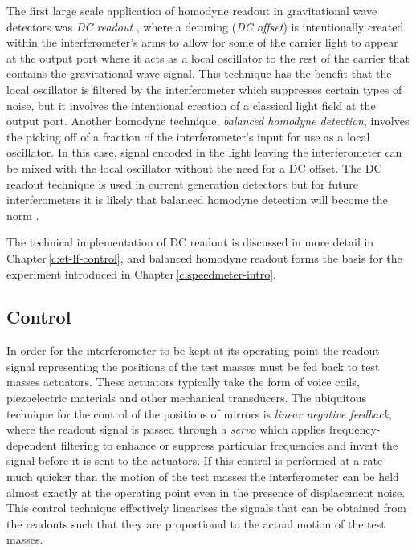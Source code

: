 The first large scale application of homodyne readout in gravitational wave detectors was \emph{\gls{DC} readout} \cite{Fricke2012}, where a detuning (\emph{\gls{DC} offset}) is intentionally created within the interferometer's arms to allow for some of the carrier light to appear at the output port where it acts as a local oscillator to the rest of the carrier that contains the gravitational wave signal. This technique has the benefit that the local oscillator is filtered by the interferometer which suppresses certain types of noise, but it involves the intentional creation of a classical light field at the output port. Another homodyne technique, \emph{balanced homodyne detection}, involves the picking off of a fraction of the interferometer's input for use as a local oscillator. In this case, signal encoded in the light leaving the interferometer can be mixed with the local oscillator without the need for a \gls{DC} offset. The \gls{DC} readout technique is used in current generation detectors but for future interferometers it is likely that balanced homodyne detection will become the norm \cite{Gard2016}.

The technical implementation of \gls{DC} readout is discussed in more detail in Chapter\,\ref{c:et-lf-control}, and balanced homodyne readout forms the basis for the experiment introduced in Chapter\,\ref{c:speedmeter-intro}.

\subsection{Control}
In order for the interferometer to be kept at its operating point the readout signal representing the positions of the test masses must be fed back to test masses actuators. These actuators typically take the form of voice coils, piezoelectric materials and other mechanical transducers. The ubiquitous technique for the control of the positions of mirrors is \emph{linear negative feedback}, where the readout signal is passed through a \emph{servo} which applies frequency-dependent filtering to enhance or suppress particular frequencies and invert the signal before it is sent to the actuators. If this control is performed at a rate much quicker than the motion of the test masses the interferometer can be held almost exactly at the operating point even in the presence of displacement noise. This control technique effectively linearises the signals that can be obtained from the readouts such that they are proportional to the actual motion of the test masses.

